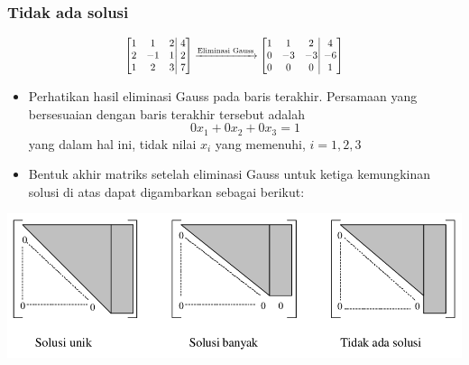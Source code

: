 \documentclass[pdflatex,compress,mathserif]{beamer}
\newcommand*{\Scale}[2][4]{\scalebox{#1}{$#2$}}%
\begin{document}
\begin{frame}
	\frametitle{Tidak ada solusi}
	\[
	\Scale[0.8]{
		\left[
		\begin{matrix}
		1 & 1 & 2\\
		2 & -1 & 1\\
		1 & 2 & 3\\
		\end{matrix}
		\right|
		\left.
		\begin{matrix}
		4 \\ 2 \\ 7
		\end{matrix}
		\right]
		\xrightarrow{\text{Eliminasi Gauss}}
		\left[
		\begin{matrix}
		1 & 1 & 2\\
		0 & -3 & -3\\
		0 & 0 & 0\\
		\end{matrix}
		\right|
		\left.
		\begin{matrix}
		4 \\ -6 \\ 1
		\end{matrix}
		\right]
	}\]
	\begin{itemize}
		\item Perhatikan hasil eliminasi Gauss pada baris terakhir. Persamaan yang bersesuaian dengan baris terakhir tersebut adalah
		\[ 0x_1 + 0x_2 + 0x_3 = 1 \]
		yang dalam hal ini, tidak nilai $ x_i $ yang memenuhi, $ i = 1, 2, 3 $
	\end{itemize}
\end{frame}

\begin{frame}
	\begin{itemize}
		\item Bentuk akhir matriks setelah eliminasi Gauss untuk ketiga kemungkinan solusi di atas dapat digambarkan sebagai berikut:
	\end{itemize}
	\begin{center}
		\includegraphics[width=0.9\linewidth]{img/img02}
	\end{center}
\end{frame}
\end{document}
